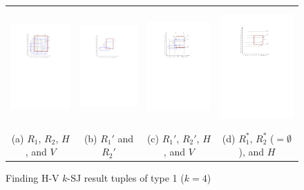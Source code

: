 \documentclass[sigconf]{acmart}
\def\figcapup{\vspace{-2mm}}
\def\figcapdown{\vspace{-2mm}}
\begin{document}
\begin{figure}
    \begin{tabular}{cccc}
        \hspace{-5mm}
        \includegraphics[height=45mm]{./artwork/alg-ex1-a} &
        \hspace{-4mm}
        \includegraphics[height=45mm]{./artwork/alg-ex1-b} & 
        \hspace{-4mm}
        \includegraphics[height=45mm]{./artwork/alg-ex1-c} &
        \hspace{-4mm}
        \includegraphics[height=45mm]{./artwork/alg-ex1-d} \\ 
        \hspace{-5mm} (a) $R_1$, $R_2$, $H$, and $V$ &
        \hspace{-4mm} (b) $R_1'$ and $R_2'$ &
        \hspace{-4mm} (c) $R_1'$, $R_2'$, $H$, and $V$ &
        \hspace{-4mm} (d) $R_1^*$, $R_2^*$ ($= \emptyset$), and $H$
    \end{tabular}
    \figcapup 
    \caption{Finding H-V $k$-SJ result tuples of type 1 ($k = 4$)} 
    \label{fig:hv:type1:ex}
    \figcapdown 
\end{figure}
\end{document}
